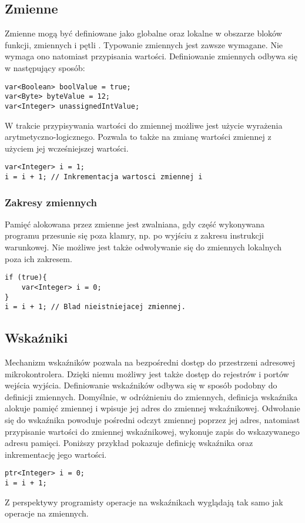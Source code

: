 \subsection{Zmienne}
Zmienne mogą być definiowane jako globalne oraz lokalne w obszarze bloków funkcji, zmiennych i pętli . Typowanie zmiennych jest zawsze wymagane. Nie wymaga ono natomiast przypisania wartości. Definiowanie zmiennych odbywa się w następujący sposób:
\begin{lstlisting}
var<Boolean> boolValue = true;
var<Byte> byteValue = 12;
var<Integer> unassignedIntValue;
\end{lstlisting}
W trakcie przypisywania wartości do zmiennej możliwe jest użycie wyrażenia arytmetyczno-logicznego. Pozwala to także na zmianę wartości zmiennej z użyciem jej wcześniejszej wartości.
\begin{lstlisting}
var<Integer> i = 1;
i = i + 1; // Inkrementacja wartosci zmiennej i
\end{lstlisting}
\subsubsection{Zakresy zmiennych}
Pamięć alokowana przez zmienne jest zwalniana, gdy część wykonywana programu przesunie się poza klamry, np. po wyjściu z zakresu instrukcji warunkowej. Nie możliwe jest także odwoływanie się do zmiennych lokalnych poza ich zakresem.
\begin{lstlisting}
if (true){
	var<Integer> i = 0;
}
i = i + 1; // Blad nieistniejacej zmiennej.
\end{lstlisting}
\subsection{Wskaźniki}
Mechanizm wskaźników pozwala na bezpośredni dostęp do przestrzeni adresowej mikrokontrolera. Dzięki niemu możliwy jest także dostęp do rejestrów i portów wejścia wyjścia.
Definiowanie wskaźników odbywa się w sposób podobny do definicji zmiennych. Domyślnie, w odróżnieniu do zmiennych, definicja wskaźnika alokuje pamięć zmiennej i wpisuje jej adres do zmiennej wskaźnikowej. Odwołanie się do wskaźnika powoduje pośredni odczyt zmiennej poprzez jej adres, natomiast przypisanie wartości do zmiennej wskaźnikowej, wykonuje zapis do wskazywanego adresu pamięci. Poniższy przykład pokazuje definicję wskaźnika oraz inkrementację jego wartości.
\begin{lstlisting}
ptr<Integer> i = 0;
i = i + 1;
\end{lstlisting}
Z perspektywy programisty operacje na wskaźnikach wyglądają tak samo jak operacje na zmiennych.

